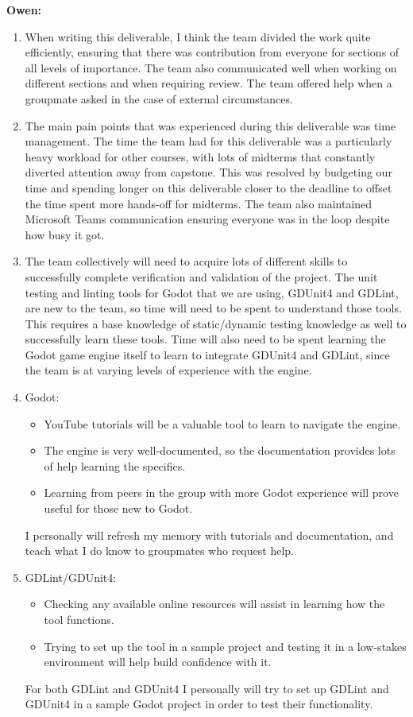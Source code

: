 \documentclass[12pt, titlepage]{article}
\begin{document}
\textbf{Owen:}
\begin{enumerate}
	\item When writing this deliverable, I think the team divided the work quite efficiently, ensuring that there was contribution from everyone for sections of all levels of importance. The team also communicated well when working on different sections and when requiring review. The team offered help when a groupmate asked in the case of external circumstances.
	
	\item The main pain points that was experienced during this deliverable was time management. The time the team had for this deliverable was a particularly heavy workload for other courses, with lots of midterms that constantly diverted attention away from capstone. This was resolved by budgeting our time and spending longer on this deliverable closer to the deadline to offset the time spent more hands-off for midterms. The team also maintained Microsoft Teams communication ensuring everyone was in the loop despite how busy it got.
	\item The team collectively will need to acquire lots of different skills to successfully complete verification and validation of the project. The unit testing and linting tools for Godot that we are using, GDUnit4 and GDLint, are new to the team, so time will need to be spent to understand those tools. This requires a base knowledge of static/dynamic testing knowledge as well to successfully learn these tools. Time will also need to be spent learning the Godot game engine itself to learn to integrate GDUnit4 and GDLint, since the team is at varying levels of experience with the engine.  
	
	\item Godot:
	\begin{itemize}
		\item YouTube tutorials will be a valuable tool to learn to navigate the engine.
		\item The engine is very well-documented, so the documentation provides lots of help learning the specifics.
		\item Learning from peers in the group with more Godot experience will prove useful for those new to Godot.
	\end{itemize}

	I personally will refresh my memory with tutorials and documentation, and teach what I do know to groupmates who request help. 
	\item GDLint/GDUnit4:
	\begin{itemize}
		\item Checking any available online resources will assist in learning how the tool functions.
		\item Trying to set up the tool in a sample project and testing it in a low-stakes environment will help build confidence with it.
	\end{itemize}

	For both GDLint and GDUnit4 I personally will try to set up GDLint and GDUnit4 in a sample Godot project in order to test their functionality. 


\end{enumerate}
\end{document}
